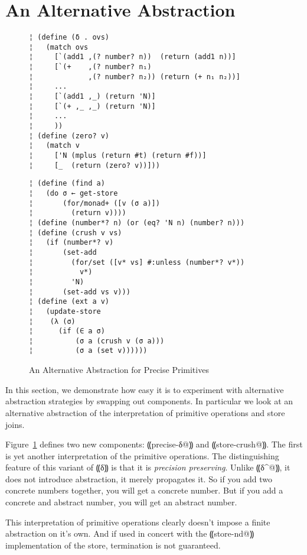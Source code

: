 \section{An Alternative Abstraction}\label{s:alt-abstraction}

\begin{figure}
\begin{lstlisting}
¦ (define (δ . ovs)
¦   (match ovs
¦     [`(add1 ,(? number? n))  (return (add1 n))]
¦     [`(+    ,(? number? n₁)
¦             ,(? number? n₂)) (return (+ n₁ n₂))]
¦     ...
¦     [`(add1 ,_) (return 'N)]
¦     [`(+ ,_ ,_) (return 'N)]
¦     ...
¦     ))
¦ (define (zero? v)
¦   (match v
¦     ['N (mplus (return #t) (return #f))]
¦     [_  (return (zero? v))]))
\end{lstlisting}
\figskip{}
\begin{lstlisting}
¦ (define (find a)
¦   (do σ ← get-store
¦       (for/monad+ ([v (σ a)])
¦         (return v))))
¦ (define (number*? n) (or (eq? 'N n) (number? n)))
¦ (define (crush v vs)
¦   (if (number*? v)
¦       (set-add 
¦         (for/set ([v* vs] #:unless (number*? v*)) 
¦           v*) 
¦         'N)
¦       (set-add vs v)))
¦ (define (ext a v)
¦   (update-store
¦    (λ (σ)
¦      (if (∈ a σ)
¦          (σ a (crush v (σ a)))
¦          (σ a (set v))))))
\end{lstlisting}
\caption{An Alternative Abstraction for Precise Primitives}
\label{f:pres-delta}
\end{figure}

In this section, we demonstrate how easy it is to experiment with
alternative abstraction strategies by swapping out components.  In
particular we look at an alternative abstraction of the interpretation
of primitive operations and store joins.

Figure~\ref{f:pres-delta} defines two new components:
⸨precise-δ@⸩ and ⸨store-crush@⸩.  The first is yet
another interpretation of the primitive operations.  The
distinguishing feature of this variant of ⸨δ⸩ is that it is
\emph{precision preserving}.  Unlike ⸨δ^@⸩, it does not
introduce abstraction, it merely propagates it.  So if you add two
concrete numbers together, you will get a concrete number.  But if you
add a concrete and abstract number, you will get an abstract number.

This interpretation of primitive operations clearly doesn't impose a
finite abstraction on it's own.  And if used in concert with the
⸨store-nd@⸩ implementation of the store, termination is not
guaranteed.  

